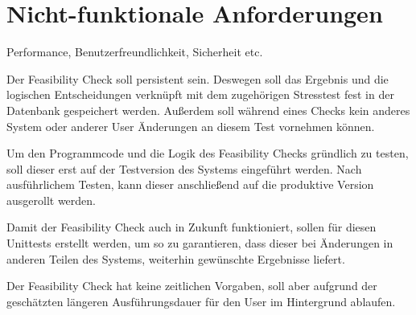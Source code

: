 \section{Nicht-funktionale Anforderungen}
Performance, Benutzerfreundlichkeit, Sicherheit etc.


Der Feasibility Check soll persistent sein. Deswegen soll das Ergebnis und die logischen Entscheidungen verknüpft mit dem zugehörigen Stresstest fest in der Datenbank gespeichert werden. Außerdem soll während eines Checks kein anderes System oder anderer User Änderungen an diesem Test vornehmen können.

Um den Programmcode und die Logik des Feasibility Checks gründlich zu testen, soll dieser erst auf der Testversion des Systems eingeführt werden. Nach ausführlichem Testen, kann dieser anschließend auf die produktive Version ausgerollt werden.

Damit der Feasibility Check auch in Zukunft funktioniert, sollen für diesen Unittests erstellt werden, um so zu garantieren, dass dieser bei Änderungen in anderen Teilen des Systems, weiterhin gewünschte Ergebnisse liefert.

Der Feasibility Check hat keine zeitlichen Vorgaben, soll aber aufgrund der geschätzten längeren Ausführungsdauer für den User im Hintergrund ablaufen.
